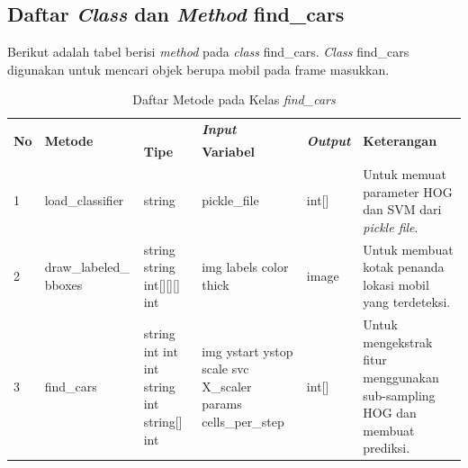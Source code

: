 \subsection{Daftar \textit{Class} dan \textit{Method} find\_cars}
Berikut adalah tabel berisi \textit{method} pada \textit{class} find\_cars. \textit{Class} find\_cars digunakan untuk mencari objek berupa mobil pada frame masukkan.
\begin{small}
	\begin{longtable}{|p{0.4cm}|p{2.6cm}|p{2cm}|p{2.5cm}|p{1.5cm}|p{4.5cm}|}
		\caption{Daftar Metode pada Kelas \textit{find\_cars}} \\	
		\hline
		\multirow{2}{*}{\textbf{No}} & \multirow{2}{*}{\textbf{Metode}} & \multicolumn{2}{c|}{\textit{\textbf{Input}}} & \multirow{2}{*}{\textit{\textbf{Output}}} & 
		\multirow{2}{*}{\textbf{Keterangan}}\\
		\cline{3-4}
		& & \textbf{Tipe} & \textbf{Variabel} & & \\
		\hline
		1 & load\_classifier & string & pickle\_file & int[] & Untuk memuat parameter HOG dan SVM dari \textit{pickle file}.\\
		\hline
		2 & draw\_labeled\_ \newline bboxes & string \newline string \newline int[][][] \newline int & img \newline labels \newline color \newline thick & image & Untuk membuat kotak penanda lokasi mobil yang terdeteksi.\\
		\hline
		3 & find\_cars & string \newline int \newline int \newline int \newline string \newline int \newline string[] \newline int & img \newline ystart \newline ystop \newline scale \newline svc \newline X\_scaler \newline params \newline cells\_per\_step & int[] & Untuk mengekstrak fitur menggunakan sub-sampling HOG dan membuat prediksi.\\
		\hline
	\end{longtable}
\end{small}

